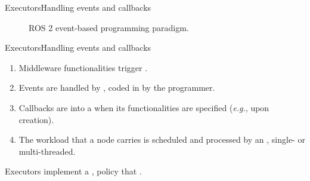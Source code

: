 \begin{frame}{Executors}{Handling events and callbacks}
	\begin{figure}
		\centering
		
		\label{fig:executorscheme}
		\caption{ROS 2 event-based programming paradigm.}
	\end{figure}
\end{frame}
\begin{frame}{Executors}{Handling events and callbacks}
	\begin{enumerate}
		\item Middleware functionalities trigger .
		\item Events are handled by , coded in  by the programmer.
		\item Callbacks are  into a  when its functionalities are specified (\emph{e.g.}, upon creation).
		\item The workload that a node carries is scheduled and processed by an , single- or multi-threaded.
	\end{enumerate}
	\begin{alertblock}{}
		\centering
		Executors implement a ,  policy that .
	\end{alertblock}
\end{frame}

